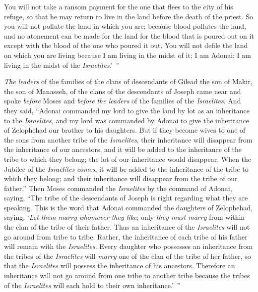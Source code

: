 \begin{biblechapter}
\verse You will not take a ransom payment for the one that flees to the city of his refuge, so that he may return to live in the land before the death of the priest.
\verse So you will not pollute the land in which you are; because blood pollutes the land, and no atonement can be made for the land for the blood that is poured out on it except with the blood of the one who poured it out.
\verse You will not defile the land on which you are living because I am living in the midst of it; I am Adonai; I am living in the midst of the \textit{Israelites}.’ ”
\end{biblechapter}

\begin{biblechapter} %
 \textit{The leaders} of the families of the clans of descendants of Gilead the son of Makir, the son of Manasseh, of the clans of the descendants of Joseph came near and spoke \textit{before} Moses and \textit{before} \textit{the leaders} of the families of the \textit{Israelites}.
\verse And they said, “Adonai commanded my lord to give the land by lot as an inheritance to the \textit{Israelites}, and my lord was commanded by Adonai to give the inheritance of Zelophehad our brother to his daughters.
\verse But if they become wives to one of the sons from another tribe of the \textit{Israelites}, their inheritance will disappear from the inheritance of our ancestors, and it will be added to the inheritance of the tribe to which they belong; the lot of our inheritance would disappear.
\verse When the Jubilee of the \textit{Israelites} \textit{comes}, it will be added to the inheritance of the tribe to which they belong; and their inheritance will disappear from the tribe of our father.”
\verse Then Moses commanded the \textit{Israelites} by the command of Adonai, saying, “The tribe of the descendants of Joseph is right regarding what they are speaking.
\verse This is the word that Adonai commanded the daughters of Zelophehad, saying, ‘\textit{Let them marry} \textit{whomever they like}; only \textit{they must marry} from within the clan of the tribe of their father.
\verse Thus an inheritance of the \textit{Israelites} will not go around from tribe to tribe. Rather, the inheritance of each tribe of his father will remain with the \textit{Israelites}.
\verse Every daughter who possesses an inheritance from the tribes of the \textit{Israelites} will \textit{marry} one of the clan of the tribe of her father, so that the \textit{Israelites} will possess the inheritance of his ancestors.
\verse Therefore an inheritance will not go around from one tribe to another tribe because the tribes of the \textit{Israelites} will each hold to their own inheritance.’ ”

\end{biblechapter}
